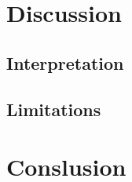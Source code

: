 \documentclass[12pt]{extarticle}
\begin{document}
\section{Discussion}
\subsection{Interpretation}
\subsection{Limitations}

\section{Conslusion}




\printbibliography
\end{document}
